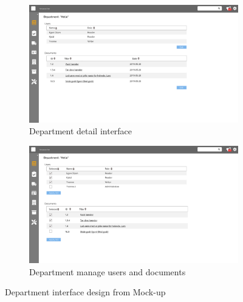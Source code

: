 \begin{figure}[H]\ContinuedFloat
	\centering
	\begin{subfigure}[b]{0.48\textwidth}
		\includegraphics[width=\textwidth]{billeder/iteration3Prototyper/Page_25.jpg}
		\caption{Department detail interface}
		\label{fig:5-DepDetail}
	\end{subfigure}
	\quad
	\begin{subfigure}[b]{0.48\textwidth}
		\includegraphics[width=\textwidth]{billeder/iteration3Prototyper/Page_26.jpg}
		\caption{Department manage users and documents}
		\label{fig:5-DepEdit}
	\end{subfigure}
	\caption{Department interface design from Mock-up}\label{fig:5-DepMockUp}
\end{figure}

\newpage
